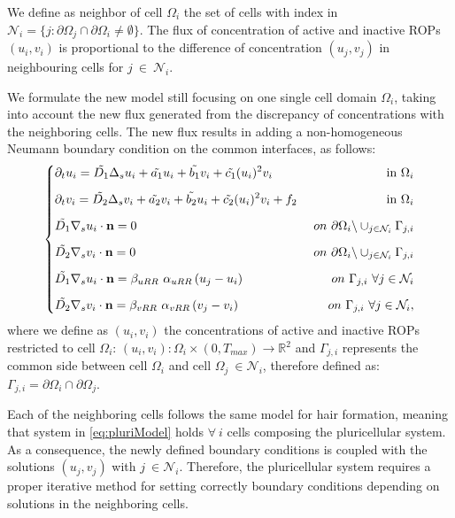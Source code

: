 We define as neighbor of cell $\Omega_i$ the set of cells with index in $\mathcal{N}_i = \{ j : \partial \Omega_j  \cap \partial \Omega_i \neq \emptyset \}$. The flux of concentration of active and inactive ROPs $(u_i, v_i)$ is proportional to the difference of concentration $(u_j, v_j)$ in neighbouring cells for $j \ \in \ \mathcal{N}_i$.

We formulate the new model still focusing on one single cell domain $\Omega_i$, taking into account the new flux generated from the discrepancy of concentrations with the neighboring cells. The new flux results in adding a non-homogeneous Neumann boundary condition on the common interfaces, as follows:
\begin{equation} \label{eq:pluriModel}
\left\lbrace
\begin{matrix}
  \begin{aligned}
    & \partial_t u_i = \Tilde{D_1} \Delta_s u_i + \Tilde{a_1} u_i + \Tilde{b_1} v_i + \Tilde{c_1} (u_i)^2 v_i & \ \text{in} \ \Omega_i\\[6pt]
    & \partial_t v_i = \Tilde{D_2} \Delta_s v_i + \Tilde{a_2} v_i + \Tilde{b_2} u_i + \Tilde{c_2} (u_i)^2 v_i + f_2 & \ \text{in} \ \Omega_i \\[6pt]
    & \Tilde{D_1} \nabla_s u_i \cdot \mathbf{n} = 0 & \ on \ \partial \Omega_i \backslash \cup_{j \in \mathcal{N}_i} \Gamma_{j,i} \\[6pt]
    & \Tilde{D_2} \nabla_s v_i \cdot \mathbf{n} = 0 & \ on \ \partial \Omega_i \backslash \cup_{j \in \mathcal{N}_i} \Gamma_{j,i} \\[6pt]
    & \Tilde{D_1} \nabla_s u_i \cdot \mathbf{n} = \beta_{uRR} \ \alpha_{uRR} \left(u_j - u_i \right) & \ on \ \Gamma_{j,i} \ \forall j \in  \mathcal{N}_i \\[6pt]
    & \Tilde{D_2} \nabla_s v_i \cdot \mathbf{n} = \beta_{vRR} \ \alpha_{vRR} \left(v_j - v_i \right) & \ on \ \Gamma_{j,i}\ \forall j \in  \mathcal{N}_i ,
  \end{aligned}
\end{matrix}
\right.
\end{equation}
where we define as $(u_i, v_i)$ the concentrations of active and inactive ROPs restricted to cell $\Omega_i$: $(u_i, v_i): \Omega_i \times \left(0, T_{max} \right) \longrightarrow \mathds{R}^2$ and $\Gamma_{j,i}$ represents the common side between cell $\Omega_i$ and cell $\Omega_j \ \in \mathcal{N}_i $, therefore defined as: $\Gamma_{j,i} = \partial \Omega_i \cap \partial \Omega_j$.

Each of the neighboring cells follows the same model for hair formation, meaning that system in \eqref{eq:pluriModel} holds $\forall \ i$ cells composing the pluricellular system. As a consequence, the newly defined boundary conditions is coupled with the solutions $(u_j, v_j)$ with $j \ \in \mathcal{N}_i$. Therefore, the pluricellular system requires a proper iterative method for setting correctly boundary conditions depending on solutions in the neighboring cells.

